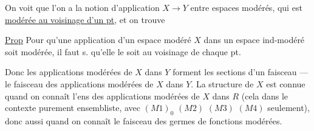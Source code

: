 On voit  que l'on a la notion d'application $X\longrightarrow Y$ entre espaces modérés, qui est \uline{modérée au voisinage d'un pt}, et on trouve

\uline{Prop} Pour qu'une application d'un espace modéré $X$ dans un espace ind-modéré soit modérée, il faut s. qu'elle le soit au voisinage de chaque pt.

Donc les applications modérées de $X$ dans $Y$ forment les sections d'un faisceau --- le faisceau des applications modérées de $X$ dans $Y$. La structure  de $X$ est connue quand on connaît l'ens des applications modérées de $X$ dans $R$ (cela  dans le contexte purement ensembliste, avec $(M1)_0$ $(M2)$ $(M3)$ $(M4)$ seulement), donc aussi quand on connaît le faisceau des germes de fonctions modérées.
